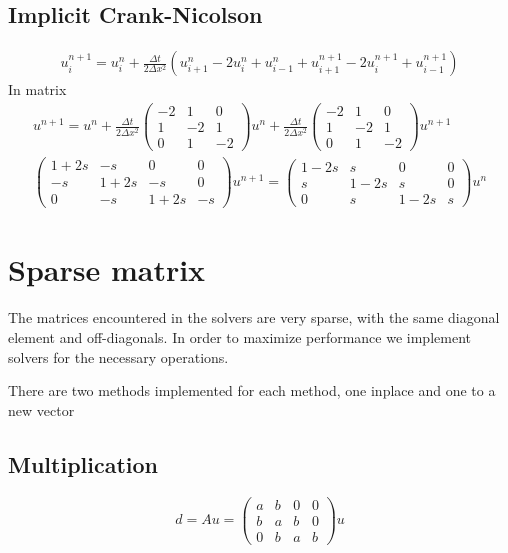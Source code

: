 \documentclass[11pt,a4paper,draft]{article}
\numberwithin{equation}{section}
\begin{document}
\subsection{Implicit Crank-Nicolson}
\begin{gather}
u_i^{n+1} = u_i^n + \frac{\Delta t}{2\Delta x^2}\left(
u_{i+1}^n - 2u_i^n + u_{i-1}^n + u_{i+1}^{n+1} - 2u_i^{n+1} + u_{i-1}^{n+1}
\right)
\end{gather}
In matrix
\begin{gather}
u^{n+1} = u^n + \frac{\Delta t}{2\Delta x^2}
\begin{pmatrix}
-2 & 1 & 0\\
1 & -2 & 1\\
0 & 1 & -2
\end{pmatrix} u^n
 + \frac{\Delta t}{2\Delta x^2}
\begin{pmatrix}
-2 & 1 & 0\\
1 & -2 & 1\\
0 & 1 & -2
\end{pmatrix}u^{n+1}\\
\begin{pmatrix}
1 + 2s & -s & 0 & 0\\
-s & 1 + 2s & -s & 0\\
0 & -s & 1 + 2s & -s
\end{pmatrix}
u^{n+1} = 
\begin{pmatrix}
1 - 2s & s & 0 & 0\\
s & 1 - 2s & s &  0\\
0 & s & 1 - 2s & s
\end{pmatrix}u^n
\end{gather}


\section{Sparse matrix}
The matrices encountered in the solvers are very sparse, with the same 
diagonal element and off-diagonals. In order to maximize performance 
we implement solvers for the necessary operations.

There are two methods implemented for each method, one inplace and one 
to a new vector

\subsection{Multiplication}
\begin{equation}
d = Au =
\begin{pmatrix}
a & b & 0 & 0\\
b & a & b & 0\\
0 & b & a & b
\end{pmatrix}u
\end{equation}
\end{document}
